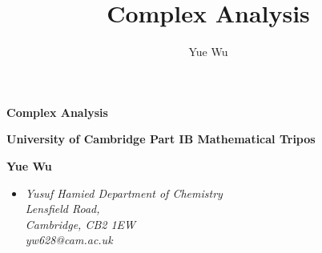 \documentclass{article}
\title{Complex Analysis}
\author{Yue Wu}
\theoremstyle{plain}\theoremheaderfont{\normalfont\itshape}\theorembodyfont{\rmfamily}\theoremseparator{.}\newtheorem*{rem}{Remark}\newtheorem*{ex}{Example}\newtheorem*{proof}{Proof}\newtheorem*{altp}{Alternative proof}\newtheorem*{con}{Consequences}\newtheorem*{notn}{Notations}\newtheorem*{cau}{Caution}\newtheorem*{term}{Terminology}\newtheorem*{keyex}{Key example}
\theoremstyle{plain}\theoremheaderfont{\normalfont\bfseries}\theorembodyfont{\rmfamily}\theoremseparator{.}\newtheorem{thm}{Theorem}[section]\newtheorem{lem}[thm]{Lemma}\newtheorem{prop}[thm]{Proposition}\newtheorem*{cor}{Corollary}\newtheorem{defn}[thm]{Definition}\newtheorem{clm}[thm]{Claim}\newtheorem{clminproof}{Claim}\newtheorem{leminproof}{Lemma}\newtheorem{app}{Application}
\theoremstyle{break}\theoremheaderfont{\normalfont\itshape}\theorembodyfont{\rmfamily}\theoremseparator{.\medskip}\newtheorem*{proofskip}{Proof}\newtheorem*{exs}{Examples}\newtheorem*{rems}{Remarks}\newtheorem*{rec}{Recall}\newtheorem*{ppts}{Properties}
\theoremstyle{break}\theoremheaderfont{\normalfont\bfseries}\theorembodyfont{\rmfamily}\theoremseparator{.\medskip}\newtheorem{lemskip}[thm]{Lemma}\newtheorem{defnskip}[thm]{Definition}\newtheorem{propskip}[thm]{Proposition}\newtheorem{thmskip}[thm]{Theorem}
\numberwithin{equation}{section}
\begin{document}
    \setlength{\parindent}{0pt}
	\Huge\textsf{\textbf{Complex Analysis}}
		
	\Large\textsf{\textbf{University of Cambridge Part IB Mathematical Tripos}}

	\noindent\makebox[\linewidth]{\rule{\textwidth}{2pt}}

	\large\textsf{\textbf{Yue Wu}}
	\begin{itemize}[topsep=0pt,leftmargin=15pt]
		\item[] \textit{Yusuf Hamied Department of Chemistry\\
		Lensfield Road,\\
		Cambridge, CB2 1EW}\\

		\textit{yw628@cam.ac.uk}
	\end{itemize}
    \thispagestyle{empty}
    \setlength{\parindent}{15pt}
	
    \normalsize
    \newpage
	\tableofcontents
	\newpage
\end{document}
